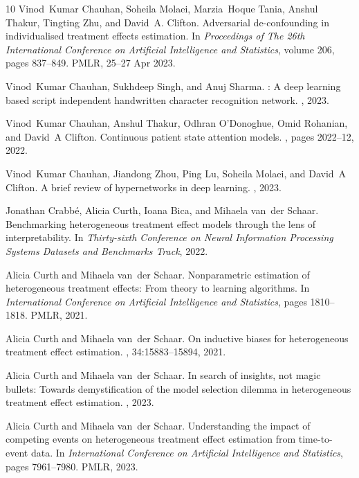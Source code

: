 \documentclass{article}
\begin{document}
\begin{thebibliography}{10}
	Vinod~Kumar Chauhan, Soheila Molaei, Marzia~Hoque Tania, Anshul Thakur,
	Tingting Zhu, and David~A. Clifton.
	\newblock Adversarial de-confounding in individualised treatment effects
	estimation.
	\newblock In {\em Proceedings of The 26th International Conference on
		Artificial Intelligence and Statistics}, volume 206, pages 837--849. PMLR,
	25--27 Apr 2023.
	
	Vinod~Kumar Chauhan, Sukhdeep Singh, and Anuj Sharma.
	: A deep learning based script independent handwritten
	character recognition network.
	, 2023.
	
	Vinod~Kumar Chauhan, Anshul Thakur, Odhran O'Donoghue, Omid Rohanian, and
	David~A Clifton.
	\newblock Continuous patient state attention models.
	, pages 2022--12, 2022.
	
	Vinod~Kumar Chauhan, Jiandong Zhou, Ping Lu, Soheila Molaei, and David~A
	Clifton.
	\newblock A brief review of hypernetworks in deep learning.
	, 2023.
	
	Jonathan Crabb{\'e}, Alicia Curth, Ioana Bica, and Mihaela van~der Schaar.
	\newblock Benchmarking heterogeneous treatment effect models through the lens
	of interpretability.
	\newblock In {\em Thirty-sixth Conference on Neural Information Processing
		Systems Datasets and Benchmarks Track}, 2022.
	
	Alicia Curth and Mihaela van~der Schaar.
	\newblock Nonparametric estimation of heterogeneous treatment effects: From
	theory to learning algorithms.
	\newblock In {\em International Conference on Artificial Intelligence and
		Statistics}, pages 1810--1818. PMLR, 2021.
	
	Alicia Curth and Mihaela van~der Schaar.
	\newblock On inductive biases for heterogeneous treatment effect estimation.
	,
	34:15883--15894, 2021.
	
	Alicia Curth and Mihaela van~der Schaar.
	\newblock In search of insights, not magic bullets: Towards demystification of
	the model selection dilemma in heterogeneous treatment effect estimation.
	, 2023.
	
	Alicia Curth and Mihaela van~der Schaar.
	\newblock Understanding the impact of competing events on heterogeneous
	treatment effect estimation from time-to-event data.
	\newblock In {\em International Conference on Artificial Intelligence and
		Statistics}, pages 7961--7980. PMLR, 2023.
	

\end{thebibliography}
\end{document}
